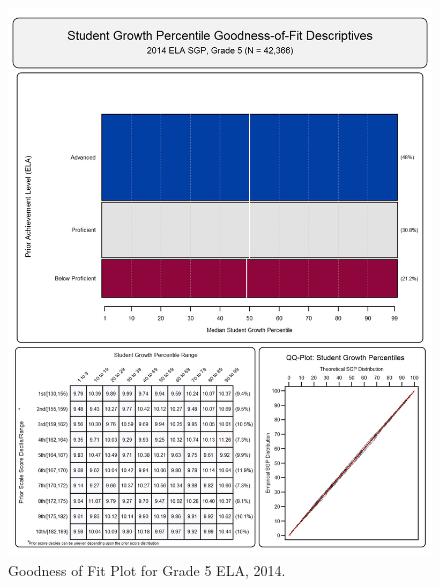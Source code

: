 \documentclass[12pt]{article}
\begin{document}
\begin{figure}[htbp]
\centering
\includegraphics{../img/Goodness_of_Fit/ELA.2014/2014_ELA_5;2013_ELA_4;2012_ELA_3.png}
\caption{Goodness of Fit Plot for Grade 5 ELA, 2014.}
\end{figure}
\end{document}
